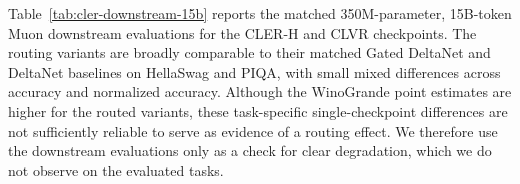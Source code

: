 \documentclass{article}
\begin{document}
\begin{table}[tbp]
    \centering
    \caption{Larger DeltaNet-only runs at 1.3B-parameter/40B-token and 3B-parameter/60B-token scale. Lower final loss is better. These rows illustrate larger-scale DeltaNet sensitivity to learning rate and stack pattern, but they are not a full architecture sweep across all mechanisms.}
    \label{tab:large-deltanet-runs}
    
\end{table}



\begin{table}[tbp]
    \centering
    \caption{Downstream checks on HellaSwag, PIQA, and WinoGrande using the local lm-eval-harness API path. Accuracy is exact-match multiple-choice accuracy; normalized accuracy is the harness's length-normalized likelihood accuracy where produced.}
    \label{tab:downstream}
    \resizebox{\linewidth}{!}{}
\end{table}

Table~\ref{tab:cler-downstream-15b} reports the matched 350M-parameter, 15B-token Muon downstream evaluations for the CLER-H and CLVR checkpoints. The routing variants are broadly comparable to their matched Gated DeltaNet and DeltaNet baselines on HellaSwag and PIQA, with small mixed differences across accuracy and normalized accuracy. Although the WinoGrande point estimates are higher for the routed variants, these task-specific single-checkpoint differences are not sufficiently reliable to serve as evidence of a routing effect. We therefore use the downstream evaluations only as a check for clear degradation, which we do not observe on the evaluated tasks.
\end{document}
